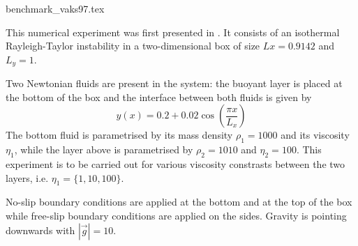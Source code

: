 \begin{flushright} {\tiny {\color{gray} benchmark\_vaks97.tex}} \end{flushright}

This numerical experiment was first presented in \cite{vaks97}.
It consists of an isothermal Rayleigh-Taylor instability in a two-dimensional box
of size $Lx=0.9142$ and $L_y=1$.

Two Newtonian fluids are present in the system: the buoyant layer is placed at the bottom of 
the box and the interface between both fluids is given by 
\begin{equation}
y(x)=0.2+0.02\cos \left( \frac{\pi x}{L_x}  \right)
\end{equation}
The bottom fluid is parametrised by its mass density $\rho_1=1000$ and its viscosity $\eta_1$, 
while the layer above is parametrised by $\rho_2=1010$ and $\eta_2=100$.
This experiment is to be carried out for various viscosity constrasts between the 
two layers, i.e. $\eta_1=\{1,10,100\}$.

No-slip boundary conditions are applied at the bottom and at the top of the box 
while free-slip boundary conditions are applied on the sides.
Gravity is pointing downwards with $|\vec{g}|=10$. 

